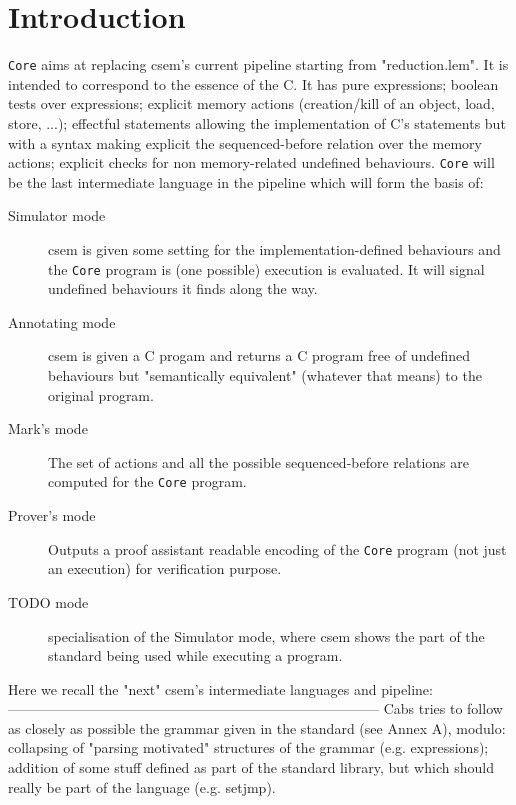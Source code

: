 \documentclass[12pt, a4paper]{article}
\title{\core{}}
\author{}
\date{}
\newcommand{\core}{\texttt{Core}}
\begin{document}

\nocite{*} 

\maketitle

\section{Introduction}
\core{} aims at replacing csem's current pipeline starting from "reduction.lem".
It is intended to correspond to the essence of the C.
It has pure expressions; boolean tests over expressions;
explicit memory actions (creation/kill of an object, load, store, ...);
effectful statements allowing the implementation of C's statements but with a syntax making explicit the sequenced-before relation over the memory actions;
explicit checks for non memory-related undefined behaviours.  \core{} will be the last intermediate language in the pipeline which will form the basis of:

\begin{description}
\item[Simulator mode]
  csem is given some setting for the implementation-defined behaviours and the \core{} program is (one possible) execution is evaluated.
  It will signal undefined behaviours it finds along the way.
  
  \item[Annotating mode]
  csem is given a C progam and returns a C program free of undefined behaviours but "semantically equivalent" (whatever that means) to the original program.
  
  \item[Mark's mode]
  The set of actions and all the possible sequenced-before relations are computed for the \core{} program.
  
  \item[Prover's mode]
  Outputs a proof assistant readable encoding of the \core{} program (not just an execution) for verification purpose.
  
  \item[TODO mode]
  specialisation of the Simulator mode, where csem shows the part of the standard being used while executing a program.
\end{description}

\newpage

Here we recall the "next" csem's intermediate languages and pipeline:
--------------------------------------------------------------------------------
Cabs    tries to follow as closely as possible the grammar given in the standard
        (see Annex A), modulo: collapsing of "parsing motivated" structures of
        the grammar (e.g. expressions); addition of some stuff defined as part
        of the standard library, but which should really be part of the
        language (e.g. setjmp).
\end{document}
